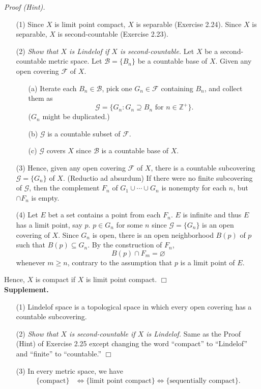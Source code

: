 \documentclass{article}
\begin{document}
\emph{Proof (Hint).}
\begin{enumerate}
\item[(1)]
Since $X$ is limit point compact, $X$ is separable (Exercise 2.24).
Since $X$ is separable, $X$ is second-countable (Exercise 2.23).
\item[(2)]
\emph{Show that $X$ is Lindelof if $X$ is second-countable.}
Let $X$ be a second-countable metric space.
Let $\mathscr{B} = \{ B_n \}$ be a countable base of $X$.
  Given any open covering $\mathscr{F}$ of $X$.
  \begin{enumerate}
  \item[(a)]
  Iterate each $B_n \in \mathscr{B}$, pick one $G_n \in \mathscr{F}$ containing $B_n$,
  and collect them as
  $$\mathscr{G} = \{ G_n : G_n \supseteq B_n \text{ for } n \in \mathbb{Z}^+ \}.$$
  ($G_n$ might be duplicated.)
  \item[(b)]
  $\mathscr{G}$ is a countable subset of $\mathscr{F}$.
  \item[(c)]
  $\mathscr{G}$ covers $X$
  since $\mathscr{B}$ is a countable base of $X$.
  \end{enumerate}
\item[(3)]
Hence,
given any open covering $\mathscr{F}$ of $X$,
there is a countable subcovering $\mathscr{G} = \{ G_n \}$ of $X$.
(Reductio ad absurdum)
If there were no finite subcovering of $\mathscr{G}$,
then the complement $F_n$ of $G_1 \cup \cdots \cup G_n$
is nonempty for each $n$, but $\cap F_n$ is empty.
\item[(4)]
Let $E$ bet a set contains a point from each $F_n$.
$E$ is infinite and thus $E$ has a limit point, say $p$.
$p \in G_n$ for some $n$ since $\mathscr{G} = \{ G_n \}$ is an open covering of $X$.
Since $G_n$ is open, there is an open neighborhood $B(p)$ of $p$ such that $B(p) \subseteq G_n$.
By the construction of $F_n$,
$$B(p) \cap F_m = \varnothing$$ whenever $m \geq n$,
contrary to the assumption that $p$ is a limit point of $E$.
\end{enumerate}
Hence, $X$ is compact if $X$ is limit point compact.
$\Box$ \\



\textbf{Supplement.}
\begin{enumerate}
\item[(1)]
Lindelof space is a topological space in which every open covering has a countable subcovering.
\item[(2)]
\emph{Show that $X$ is second-countable if $X$ is Lindelof.}
Same as the Proof (Hint) of Exercise 2.25 except
changing the word ``compact'' to ``Lindelof'' and ``finite'' to ``countable.''
$\Box$
\item[(3)]In every metric space, we have
\begin{align*}
\{ \text{compact} \}
&\Longleftrightarrow
\{ \text{limit point compact} \}
\Longleftrightarrow
\{ \text{sequentially compact} \}. \\
\end{align*}
\end{enumerate}
\end{document}
